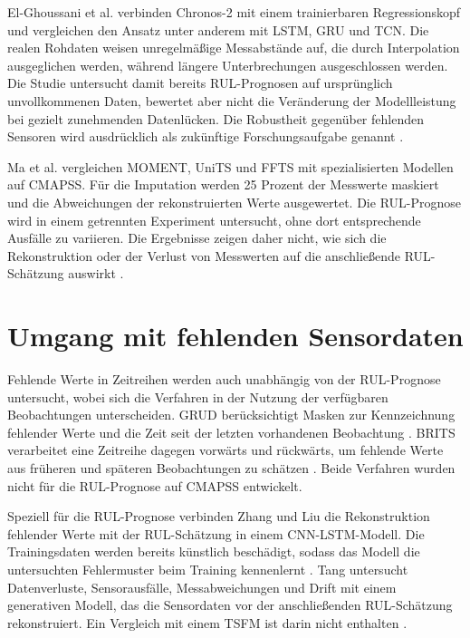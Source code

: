 El-Ghoussani et al. verbinden Chronos-2 mit einem trainierbaren Regressionskopf und vergleichen den Ansatz unter anderem mit \ac{LSTM}, \ac{GRU} und \ac{TCN}. Die realen Rohdaten weisen unregelmäßige Messabstände auf, die durch Interpolation ausgeglichen werden, während längere Unterbrechungen ausgeschlossen werden. Die Studie untersucht damit bereits \ac{RUL}-Prognosen auf ursprünglich unvollkommenen Daten, bewertet aber nicht die Veränderung der Modellleistung bei gezielt zunehmenden Datenlücken. Die Robustheit gegenüber fehlenden Sensoren wird ausdrücklich als zukünftige Forschungsaufgabe genannt \parencite[Abschn.~II-A, III-C und IV]{el-ghoussaniTimeSeriesFoundationModel2026}.

Ma et al. vergleichen MOMENT, UniTS und FFTS mit spezialisierten Modellen auf \ac{CMAPSS}. Für die Imputation werden 25 Prozent der Messwerte maskiert und die Abweichungen der rekonstruierten Werte ausgewertet. Die \ac{RUL}-Prognose wird in einem getrennten Experiment untersucht, ohne dort entsprechende Ausfälle zu variieren. Die Ergebnisse zeigen daher nicht, wie sich die Rekonstruktion oder der Verlust von Messwerten auf die anschließende \ac{RUL}-Schätzung auswirkt \parencite[Abschn.~3.2.1 und 3.2.4]{maBenchmarkingTimeSeries2026}.

\section{Umgang mit fehlenden Sensordaten}

Fehlende Werte in Zeitreihen werden auch unabhängig von der \ac{RUL}-Prognose untersucht, wobei sich die Verfahren in der Nutzung der verfügbaren Beobachtungen unterscheiden. \ac{GRUD} berücksichtigt Masken zur Kennzeichnung fehlender Werte und die Zeit seit der letzten vorhandenen Beobachtung \parencite{cheRecurrentNeuralNetworks2018}. \ac{BRITS} verarbeitet eine Zeitreihe dagegen vorwärts und rückwärts, um fehlende Werte aus früheren und späteren Beobachtungen zu schätzen \parencite{caoBRITSBidirectionalRecurrent}. Beide Verfahren wurden nicht für die \ac{RUL}-Prognose auf \ac{CMAPSS} entwickelt.

Speziell für die \ac{RUL}-Prognose verbinden Zhang und Liu die Rekonstruktion fehlender Werte mit der \ac{RUL}-Schätzung in einem \ac{CNN}-\ac{LSTM}-Modell. Die Trainingsdaten werden bereits künstlich beschädigt, sodass das Modell die untersuchten Fehlermuster beim Training kennenlernt \parencite[4--6, 9--14]{zhangLSTMBasedMultiTaskMethod2023}. Tang untersucht Datenverluste, Sensorausfälle, Messabweichungen und Drift mit einem generativen Modell, das die Sensordaten vor der anschließenden \ac{RUL}-Schätzung rekonstruiert. Ein Vergleich mit einem \ac{TSFM} ist darin nicht enthalten \parencite[3--6, 9--10, 19]{tangDeepLearningFramework2026}.

